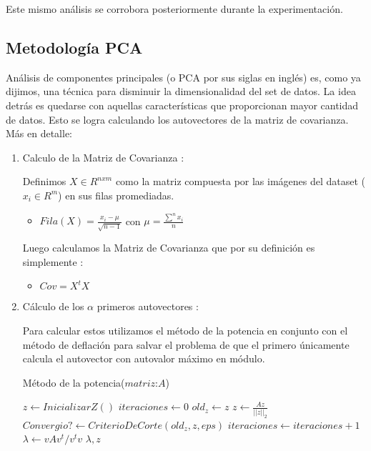 Este mismo análisis se corrobora posteriormente durante la experimentación.

\subsection{Metodología PCA}
Análisis de componentes principales (o PCA por sus siglas en inglés) es, como ya dijimos, una técnica para disminuir la dimensionalidad del set de datos. La idea detrás es quedarse con aquellas características que proporcionan mayor cantidad de datos. Esto se logra calculando los autovectores de la matriz de covarianza\cite{ImageProcBook}. Más en detalle:

 \begin{enumerate}
     \item Calculo de la Matriz de Covarianza :
     
Definimos $X \in R^{nxm}$ como la matriz compuesta por las imágenes del dataset ($x_i \in R^{m}$) en sus filas promediadas. 
\par

\begin{itemize}
	\item $Fila(X) =  \frac{x_i - \mu}{\sqrt{n-1}}$  con $\mu =\frac{\sum^{n} x_i}{n} $
\end{itemize}

Luego calculamos la Matriz de Covarianza que por su definición es simplemente :
\begin{itemize}
	\item $Cov=  X^{t}X $
\end{itemize}

\item Cálculo de los $\alpha$ primeros autovectores : 

Para calcular estos utilizamos el método de la potencia en conjunto con el método de deflación para salvar el problema de que el primero únicamente calcula el autovector con autovalor máximo en módulo.

\begin{algorithm}[H]
\caption{Método de la potencia($matriz$:$A$)}
\begin{algorithmic}[H]
    \State $z \leftarrow InicializarZ()$
    \State $iteraciones \leftarrow 0$
        \State $old_z \leftarrow z$
        \State $z \leftarrow \frac{Az}{||z ||_2}$
        \State $Convergio? \leftarrow CriterioDeCorte(old_z,z,eps)$
        \State $iteraciones \leftarrow iteraciones +1$
    \EndWhile  
    \State $\lambda \leftarrow vAv^t/v^tv$
    \State
    \Return  $\lambda,z$
\end{algorithmic}
\end{algorithm}


\end{enumerate}
